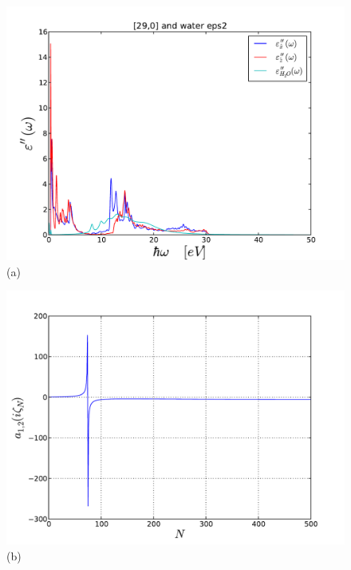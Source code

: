 \documentclass[onecolumn,letterpaper,amsmath,amssymb,floatfix,aps,superscriptaddress]{revtex4}
\begin{document}
\begin{figure}[t!]
\begin{center}
\begin{minipage}[b]{0.40\textwidth}
\begin{center}
\includegraphics[width=1.2\textwidth]{eps_290.pdf} (a)
\end{center}
\end{minipage}
\hskip 43pt
\begin{minipage}[b]{0.40\textwidth}
\begin{center}
\includegraphics[width=1.2\textwidth]{aiz_290.pdf} (b)
\end{center}
\end{minipage}

\end{center}
\end{figure}
\end{document}
